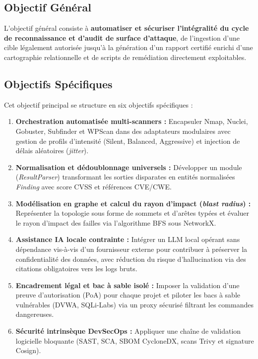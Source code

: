 \subsection{Objectif G\'en\'eral}
\par L'objectif g\'en\'eral consiste \`a \textbf{automatiser et s\'ecuriser l'int\'egralit\'e du cycle de reconnaissance et d'audit de surface d'attaque}, de l'ingestion d'une cible l\'egalement autoris\'ee jusqu'\`a la g\'en\'eration d'un rapport certifi\'e enrichi d'une cartographie relationnelle et de scripts de rem\'ediation directement exploitables.

\subsection{Objectifs Sp\'ecifiques}
\par Cet objectif principal se structure en six objectifs sp\'ecifiques :
\begin{enumerate}
    \item \textbf{Orchestration automatis\'ee multi-scanners :} Encapsuler Nmap, Nuclei, Gobuster, Subfinder et WPScan dans des adaptateurs modulaires avec gestion de profils d'intensit\'e (Silent, Balanced, Aggressive) et injection de d\'elais al\'eatoires (\textit{jitter}).
    \item \textbf{Normalisation et d\'edoublonnage universels :} D\'evelopper un module (\textit{ResultParser}) transformant les sorties disparates en entit\'es normalis\'ees \textit{Finding} avec score CVSS et r\'ef\'erences CVE/CWE.
    \item \textbf{Mod\'elisation en graphe et calcul du rayon d'impact (\textit{blast radius}) :} Repr\'esenter la topologie sous forme de sommets et d'ar\^etes typ\'ees et \'evaluer le rayon d'impact des failles via l'algorithme BFS sous NetworkX.
    \item \textbf{Assistance IA locale contrainte :} Int\'egrer un LLM local op\'erant sans d\'ependance vis-\`a-vis d'un fournisseur externe pour contribuer \`a pr\'eserver la confidentialit\'e des donn\'ees, avec r\'eduction du risque d'hallucination via des citations obligatoires vers les logs bruts.
    \item \textbf{Encadrement l\'egal et bac \`a sable isol\'e :} Imposer la validation d'une preuve d'autorisation (PoA) pour chaque projet et piloter les bacs \`a sable vuln\'erables (DVWA, SQLi-Labs) via un proxy s\'ecuris\'e filtrant les commandes dangereuses.
    \item \textbf{S\'ecurit\'e intrins\`eque DevSecOps :} Appliquer une cha\^ine de validation logicielle bloquante (SAST, SCA, SBOM CycloneDX, scans Trivy et signature Cosign).
\end{enumerate}


